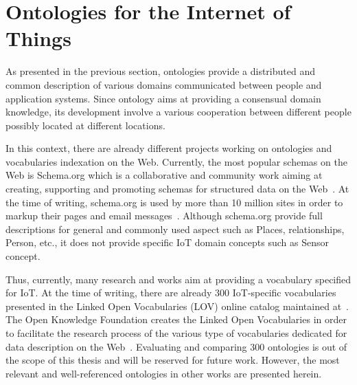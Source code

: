 \section{Ontologies for the Internet of Things}

As presented in the previous section, ontologies provide a distributed and common description of various domains communicated between people and application systems. Since ontology aims at providing a consensual domain knowledge, its development involve a various cooperation between different people possibly located at different locations.\par 
In this context, there are already different projects working on ontologies and vocabularies indexation on the Web. Currently, the most popular schemas on the Web is Schema.org which is a collaborative and community work aiming at creating, supporting and promoting schemas for structured data on the Web~\cite{stacksemantic1}. At the time of writing, schema.org is used by more than 10 million sites in order to markup their pages and email messages~\cite{schema}. Although schema.org provide full descriptions for general and commonly used aspect such as Places, relationships, Person, etc., it does not provide specific IoT domain concepts such as Sensor concept.\par 

Thus, currently, many research and works aim at providing a vocabulary specified for IoT. At the time of writing, there are already 300 IoT-specific vocabularies presented in the Linked Open Vocabularies (LOV) online catalog maintained at~\cite{site}. The Open Knowledge Foundation creates the Linked Open Vocabularies in order to facilitate the research process of the various type of vocabularies dedicated for data description on the Web~\cite{rfr}. Evaluating and comparing 300 ontologies is out of the scope of this thesis and will be reserved for future work. However, the most relevant and well-referenced ontologies in other works are presented herein. \par 

